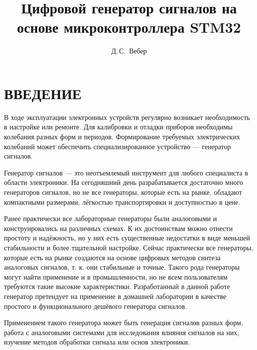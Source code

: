 \documentclass[14pt, oneside]{altsu-bachelor}
\title{Цифровой генератор сигналов на основе микроконтроллера STM32}
\author{Д.\,С.~Вебер}
\institute{Институт цифровых технологий, электроники и физики}
\date{\the\year}
\begin{document}
\maketitle

\setcounter{page}{2}
\makeabstract
\tableofcontents

\chapter*{ВВЕДЕНИЕ}
	В ходе эксплуатации электронных устройств регулярно возникает необходимость в настройке или ремонте. Для калибровки и отладки приборов необходимы колебания разных форм и периодов. Формирование требуемых электрических колебаний может обеспечить специализированное устройство --- генератор сигналов.
	
	Генератор сигналов --- это неотъемлемый инструмент для любого специалиста в области электроники. %
	На сегодняшний день разрабатывается достаточно много генераторов сигналов, %
	 но не все генераторы, которые есть на рынке, обладают компактными размерами, лёгкостью транспортировки и доступностью в цене. %
	
	Ранее практически все лабораторные генераторы были аналоговыми и конструировались на различных схемах. К их достоинствам можно отнести простоту и надёжность, но у них есть существенные недостатки в виде меньшей стабильности и более тщательной настройке. Сейчас практически все генераторы, которые есть на рынке создаются на основе цифровых методов синтеза аналоговых сигналов, %
	 т. к. они стабильные и точные. %
	 Такого рода генераторы могут найти применение и в промышленности, но не всем пользователям требуются такие высокие характеристики. Разработанный в данной работе генератор претендует на применение в домашней лаборатории в качестве простого и функционального дешёвого генератора сигналов.
	
	Применением такого генератора может быть генерация сигналов разных форм, работа с аналоговыми системами для исследования влияния сигналов на них, изучение методов обработки сигнала или основ электроники. 
	
\end{document}
